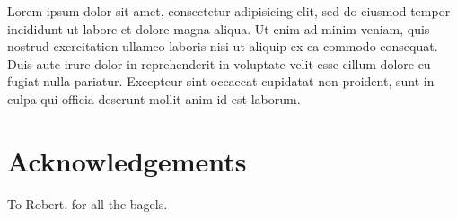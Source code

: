\documentclass[annual]{acmsiggraph}
\begin{document}
Lorem ipsum dolor sit amet, consectetur adipisicing elit, sed do
eiusmod tempor incididunt ut labore et dolore magna aliqua. Ut enim ad
minim veniam, quis nostrud exercitation ullamco laboris nisi ut
aliquip ex ea commodo consequat. Duis aute irure dolor in
reprehenderit in voluptate velit esse cillum dolore eu fugiat nulla
pariatur. Excepteur sint occaecat cupidatat non proident, sunt in
culpa qui officia deserunt mollit anim id est laborum.

\section*{Acknowledgements}

To Robert, for all the bagels.



\end{document}
